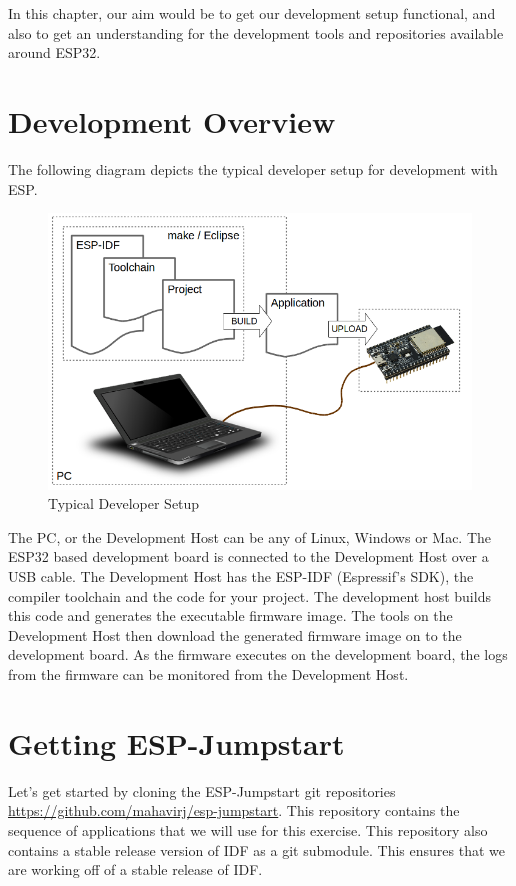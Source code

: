 \documentclass[main.tex]{subfiles}
\begin{document}
In this chapter, our aim would be to get our development setup functional, and also to get an understanding for the development tools and repositories available around ESP32.

\section{Development Overview}

The following diagram depicts the typical developer setup for development with ESP.
\begin{figure}[h]
    \centering
    \includegraphics[scale=0.3]{Pictures/dev_setup.png}
    \caption{Typical Developer Setup}
    \label{fig:dev_setup}
\end{figure}

The PC, or the Development Host can be any of Linux, Windows or Mac. The ESP32 based development board is connected to the Development Host over a USB cable. The Development Host has the ESP-IDF (Espressif's SDK), the compiler toolchain and the code for your project. The development host builds this code and generates the executable firmware image. The tools on the Development Host then download the generated firmware image on to the development board. As the firmware executes on the development board, the logs from the firmware can be monitored from the Development Host.

\section{Getting ESP-Jumpstart}

Let's get started by cloning the ESP-Jumpstart git repositories \url{https://github.com/mahavirj/esp-jumpstart}. This repository contains the sequence of applications that we will use for this exercise. This repository also contains a stable release version of IDF as a git submodule. This ensures that we are working off of a stable release of IDF.
\end{document}
